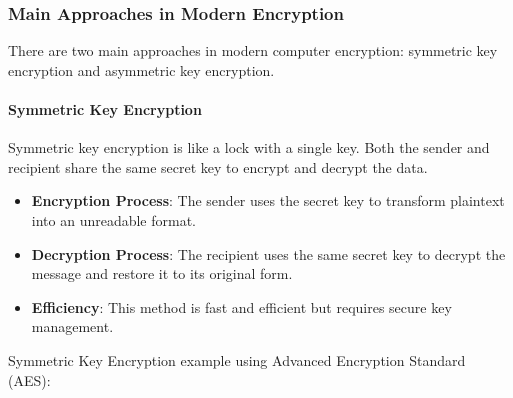 \subsubsection{Main Approaches in Modern Encryption}

There are two main approaches in modern computer encryption: symmetric key encryption and asymmetric key encryption.

\paragraph{Symmetric Key Encryption}

Symmetric key encryption is like a lock with a single key. Both the sender and recipient share the same secret key to encrypt and decrypt the data.

\begin{itemize}
    \item \textbf{Encryption Process}: The sender uses the secret key to transform plaintext into an unreadable format.
    \item \textbf{Decryption Process}: The recipient uses the same secret key to decrypt the message and restore it to its original form.
    \item \textbf{Efficiency}: This method is fast and efficient but requires secure key management.
\end{itemize}

Symmetric Key Encryption example using Advanced Encryption Standard (AES):

